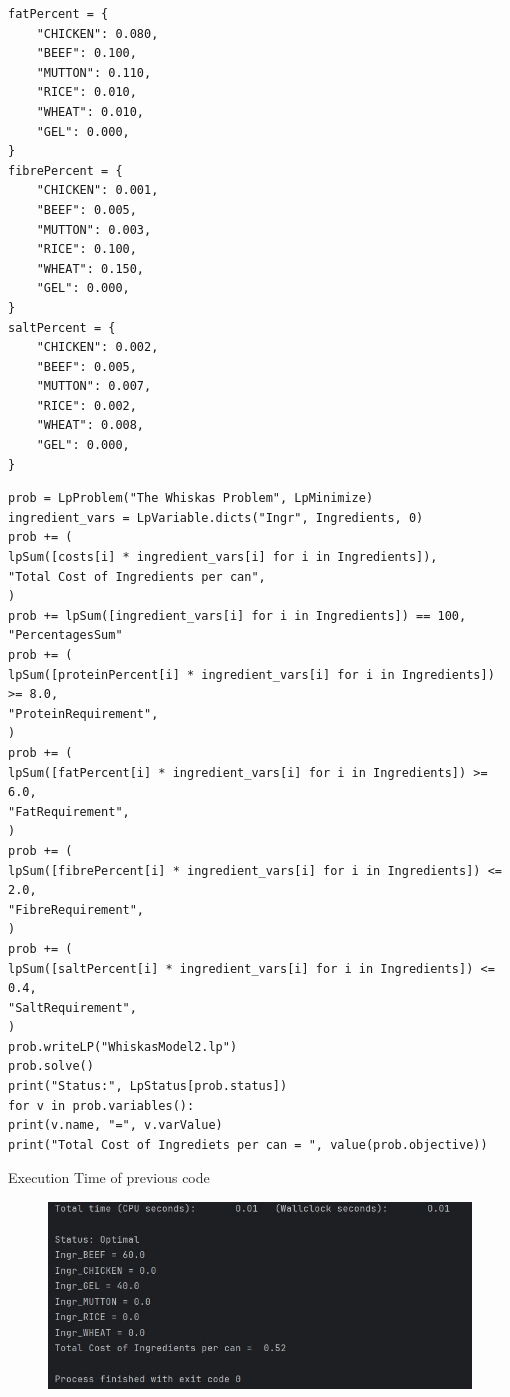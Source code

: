 \documentclass{purdue-slide}
\begin{document}
\begin{frame}
	\begin{verbatim}
fatPercent = {
	"CHICKEN": 0.080,
	"BEEF": 0.100,
	"MUTTON": 0.110,
	"RICE": 0.010,
	"WHEAT": 0.010,
	"GEL": 0.000,
}
fibrePercent = {
	"CHICKEN": 0.001,
	"BEEF": 0.005,
	"MUTTON": 0.003,
	"RICE": 0.100,
	"WHEAT": 0.150,
	"GEL": 0.000,
}
saltPercent = {
	"CHICKEN": 0.002,
	"BEEF": 0.005,
	"MUTTON": 0.007,
	"RICE": 0.002,
	"WHEAT": 0.008,
	"GEL": 0.000,
}
	\end{verbatim}
\end{frame}

\begin{frame}
	\begin{verbatim}
prob = LpProblem("The Whiskas Problem", LpMinimize)
ingredient_vars = LpVariable.dicts("Ingr", Ingredients, 0)
prob += (
lpSum([costs[i] * ingredient_vars[i] for i in Ingredients]),
"Total Cost of Ingredients per can",
)
prob += lpSum([ingredient_vars[i] for i in Ingredients]) == 100, "PercentagesSum"
prob += (
lpSum([proteinPercent[i] * ingredient_vars[i] for i in Ingredients]) >= 8.0,
"ProteinRequirement",
)
prob += (
lpSum([fatPercent[i] * ingredient_vars[i] for i in Ingredients]) >= 6.0,
"FatRequirement",
)
prob += (
lpSum([fibrePercent[i] * ingredient_vars[i] for i in Ingredients]) <= 2.0,
"FibreRequirement",
)
prob += (
lpSum([saltPercent[i] * ingredient_vars[i] for i in Ingredients]) <= 0.4,
"SaltRequirement",
)
prob.writeLP("WhiskasModel2.lp")
prob.solve()
print("Status:", LpStatus[prob.status])
for v in prob.variables():
print(v.name, "=", v.varValue)
print("Total Cost of Ingrediets per can = ", value(prob.objective))
	\end{verbatim}
\end{frame}

\begin{frame}{Execution Time of previous code}
	\begin{figure}[H]
		\centering
		\includegraphics[width=340pt]{pics/bertold-rez-2-exec-time.jpeg}
	\end{figure}
\end{frame}
\end{document}
